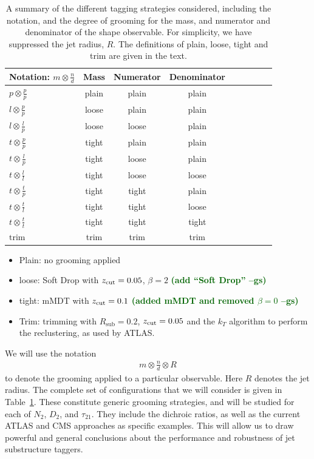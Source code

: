 \documentclass[11pt,letterpaper]{article}
\DeclareRobustCommand{\Tab}[1]{Table~\ref{#1}}
\newcommand{\zcut}{z_{\rm cut}}
\newcommand{\gs}[1]{\textbf{\textcolor{darkgreen}{(#1 --gs)}}}
\begin{document}
\begin{table}[t!]
\begin{center}
\begin{tabular}{| l | c | c |c |c|c|c |c|r| }
  \hline                       
  Notation: $m \otimes \frac{n}{d}$ & Mass & Numerator & Denominator\\
  \hline
  $p \otimes \frac{p}{p}$ & plain  &  plain & plain \\
  $l \otimes \frac{p}{p}$ & loose  &  plain & plain \\
  $l \otimes \frac{l}{p}$ & loose  &  loose & plain \\
  $t \otimes \frac{p}{p}$ & tight  &  plain & plain \\
  $t \otimes \frac{l}{p}$ & tight  &  loose & plain \\
  $t \otimes \frac{l}{l}$ & tight  &  loose & loose \\
  $t \otimes \frac{t}{p}$ & tight  &  tight & plain \\
  $t \otimes \frac{t}{l}$ & tight  &  tight & loose \\
  $t \otimes \frac{t}{t}$ & tight  &  tight & tight \\
  $\text{trim}$ & trim &  trim & trim \\
  \hline  
\end{tabular}
\end{center}
\caption{
A summary of the different tagging strategies considered, including the notation, and the degree of grooming for the mass, and numerator and denominator of the shape observable. For simplicity, we have suppressed the jet radius, $R$. The definitions of plain, loose, tight and trim are given in the text.
}
\label{tab:tag_summary}
\end{table}


\begin{itemize}
\item Plain: no grooming applied
\item loose: Soft Drop with $\zcut=0.05$, $\beta=2$ \gs{add ``Soft Drop''}
\item tight: mMDT with $\zcut=0.1$ \gs{added mMDT and removed $\beta=0$}
\item Trim: trimming with $R_{\text{sub}}=0.2$,  $ \zcut=0.05$ and the $k_T$ algorithm to perform the reclustering, as used by ATLAS.
\end{itemize}
We will use the notation 
\begin{align}
m \otimes \frac{n}{d} \otimes R
\end{align}
to denote the grooming applied to a particular observable. Here $R$ denotes the jet radius. The complete set of configurations that we will consider is given in \Tab{tab:tag_summary}. These constitute generic grooming strategies, and will be studied for each of $N_2$, $D_2$, and $\tau_{21}$. They include the dichroic ratios, as well as the current ATLAS and CMS approaches as specific examples.  This will allow us to draw powerful and general conclusions about the performance and robustness of jet substructure taggers.
\end{document}
